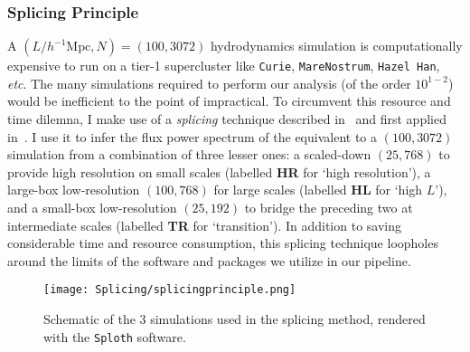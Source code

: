 \subsubsection{Splicing Principle}

A $(L/h^{-1}\mathrm{Mpc}, N) = (100, 3072)$ hydrodynamics simulation is computationally expensive to run on a tier-1 supercluster like \texttt{Curie}, \texttt{MareNostrum}, \texttt{Hazel Han}, \textit{etc}. The many simulations required to perform our analysis (of the order $10^{1-2}$) would be inefficient to the point of impractical. To circumvent this resource and time dilemna, I make use of a \emph{splicing} technique described in~\cite{McDonald2003} and first applied in~\cite{Borde2014,Palanque2015a}. I use it to infer the flux power spectrum of the equivalent to a $(100, 3072)$ simulation from a combination of three lesser ones: a scaled-down $(25, 768)$ to provide high resolution on small scales (labelled \textbf{HR} for `high resolution'), a large-box low-resolution $(100, 768)$ for large scales (labelled \textbf{HL} for `high $L$'), and a small-box low-resolution $(25, 192)$ to bridge the preceding two at intermediate scales (labelled \textbf{TR} for `transition'). In addition to saving considerable time and resource consumption, this splicing technique loopholes around the limits of the software and packages we utilize in our pipeline. \\

\begin{figure}
\begin{center}
\texttt{[image: Splicing/splicingprinciple.png]}
\caption{Schematic of the 3 simulations used in the splicing method, rendered with the \texttt{Sploth} software. }
\label{fig:splicingprinciple}
\end{center}
\end{figure}

